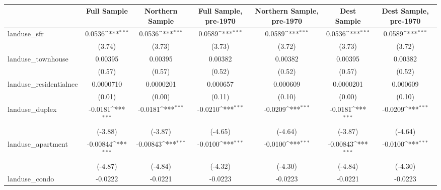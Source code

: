 \begin{table}[htbp]\centering
\def\sym#1{\ifmmode^{#1}\else\(^{#1}\)\fi}
\caption{ \label{tab1}}
\begin{tabular}{l*{6}{c}}
\toprule
                    &\multicolumn{1}{c}{Full Sample}&\multicolumn{1}{c}{Northern Sample}&\multicolumn{1}{c}{Full Sample, pre-1970}&\multicolumn{1}{c}{Northern Sample, pre-1970}&\multicolumn{1}{c}{Dest Sample}&\multicolumn{1}{c}{Dest Sample, pre-1970}\\
\midrule
landuse\_sfr         &      0.0536\sym{***}&      0.0536\sym{***}&      0.0589\sym{***}&      0.0589\sym{***}&      0.0536\sym{***}&      0.0589\sym{***}\\
                    &      (3.74)         &      (3.73)         &      (3.73)         &      (3.72)         &      (3.73)         &      (3.72)         \\
\addlinespace
landuse\_townhouse   &     0.00395         &     0.00395         &     0.00382         &     0.00382         &     0.00395         &     0.00382         \\
                    &      (0.57)         &      (0.57)         &      (0.52)         &      (0.52)         &      (0.57)         &      (0.52)         \\
\addlinespace
landuse\_residentialnec&   0.0000710         &   0.0000201         &    0.000657         &    0.000609         &   0.0000201         &    0.000609         \\
                    &      (0.01)         &      (0.00)         &      (0.11)         &      (0.10)         &      (0.00)         &      (0.10)         \\
\addlinespace
landuse\_duplex      &     -0.0181\sym{***}&     -0.0181\sym{***}&     -0.0210\sym{***}&     -0.0209\sym{***}&     -0.0181\sym{***}&     -0.0209\sym{***}\\
                    &     (-3.88)         &     (-3.87)         &     (-4.65)         &     (-4.64)         &     (-3.87)         &     (-4.64)         \\
\addlinespace
landuse\_apartment   &    -0.00844\sym{***}&    -0.00843\sym{***}&     -0.0100\sym{***}&     -0.0100\sym{***}&    -0.00843\sym{***}&     -0.0100\sym{***}\\
                    &     (-4.87)         &     (-4.84)         &     (-4.32)         &     (-4.30)         &     (-4.84)         &     (-4.30)         \\
\addlinespace
landuse\_condo       &     -0.0222         &     -0.0221         &     -0.0223         &     -0.0223         &     -0.0221         &     -0.0223         \\

\end{tabular}
\end{table}
